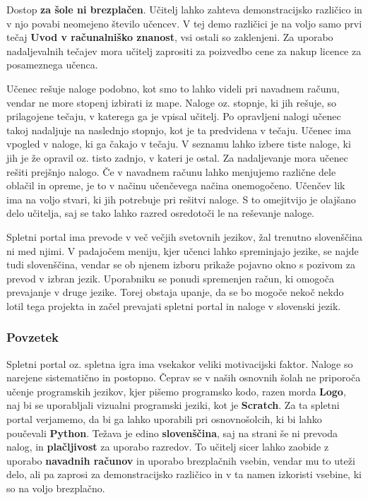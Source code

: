 Dostop \textbf{za šole ni brezplačen}. Učitelj lahko zahteva
demonstracijsko različico in v njo povabi neomejeno število učencev. V
tej demo različici je na voljo samo prvi tečaj \textbf{Uvod v
  računalniško znanost}, vsi ostali so zaklenjeni. Za uporabo
nadaljevalnih tečajev mora učitelj zaprositi za poizvedbo cene za nakup
licence za posameznega učenca.

Učenec rešuje naloge podobno, kot smo to lahko videli pri navadnem
računu, vendar ne more stopenj izbirati iz mape. Naloge oz. stopnje,
ki jih rešuje, so prilagojene tečaju, v katerega ga je vpisal
učitelj. Po opravljeni nalogi učenec takoj nadaljuje na naslednjo
stopnjo, kot je ta predvidena v tečaju. Učenec ima vpogled v naloge,
ki ga čakajo v tečaju. V seznamu lahko izbere tiste naloge, ki jih je
že opravil oz. tisto zadnjo, v kateri je ostal. Za nadaljevanje mora
učenec rešiti prejšnjo nalogo. Če v navadnem računu lahko menjujemo
različne dele oblačil in opreme, je to v načinu učenčevega načina
onemogočeno. Učenčev lik ima na voljo stvari, ki jih potrebuje pri
rešitvi naloge. S to omejitvijo je olajšano delo učitelja, saj se tako
lahko razred osredotoči le na reševanje naloge.


 Spletni portal ima prevode v več večjih svetovnih jezikov, žal
 trenutno slovenščina ni med njimi. V padajočem meniju, kjer učenci
 lahko spreminjajo jezike, se najde tudi slovenščina, vendar se ob
 njenem izboru prikaže pojavno okno s pozivom za prevod v izbran
 jezik. Uporabniku se ponudi spremenjen račun, ki omogoča prevajanje v
 druge jezike. Torej obstaja upanje, da se bo mogoče nekoč nekdo
 lotil tega projekta in začel prevajati spletni portal in naloge v
 slovenski jezik. 

\subsubsection{Povzetek}
\label{sec:povzetek:codecombat}

Spletni portal oz. spletna igra ima vsekakor veliki motivacijski
faktor. Naloge so narejene sistematično in postopno. Čeprav se v
naših osnovnih šolah ne priporoča učenje programskih jezikov, kjer
pišemo programsko kodo, razen morda \textbf{Logo}, naj bi se
uporabljali vizualni programski jeziki, kot je \textbf{Scratch}. Za ta
spletni portal verjamemo, da bi ga lahko uporabili pri osnovnošolcih,
ki bi lahko poučevali \textbf{Python}. Težava je edino
\textbf{slovenščina}, saj na strani še ni prevoda nalog, in
\textbf{plačljivost} za uporabo razredov. To učitelj sicer lahko
zaobide z uporabo \textbf{navadnih računov} in uporabo brezplačnih
vsebin, vendar mu to uteži delo, ali pa zaprosi za demonstracijsko
različico in v ta namen izkoristi vsebine, ki so na voljo brezplačno. 


